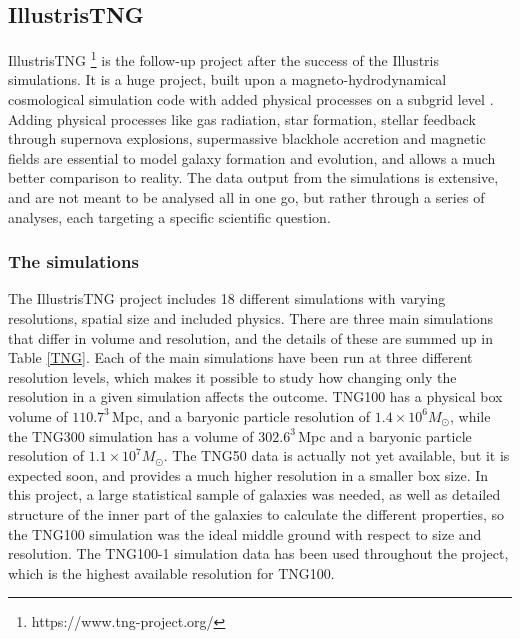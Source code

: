 \subsection{IllustrisTNG}
IllustrisTNG \footnote{https://www.tng-project.org/} is the follow-up project after the success of the Illustris simulations. It is a huge project, built upon a magneto-hydrodynamical cosmological simulation code with added physical processes on a subgrid level \parencite{Weinberger2016}. Adding physical processes like gas radiation, star formation, stellar feedback through supernova explosions, supermassive blackhole accretion and magnetic fields are essential to model galaxy formation and evolution, and allows a much better comparison to reality. The data output from the simulations is extensive, and are not meant to be analysed all in one go, but rather through a series of analyses, each targeting a specific scientific question. 


\subsubsection{The simulations}
The IllustrisTNG project includes 18 different simulations with varying resolutions, spatial size and included physics. There are three main simulations that differ in volume and resolution, and the details of these are summed up in Table \ref{TNG}. Each of the main simulations have been run at three different resolution levels, which makes it possible to study how changing only the resolution in a given simulation affects the outcome. TNG100 has a physical box volume of $110.7^3 \, $Mpc, and a baryonic particle resolution of $1.4 \times 10^6 M_{\odot}$, while the TNG300 simulation has a volume of $302.6^3 \, $Mpc and a baryonic particle resolution of $1.1 \times 10^7 M_{\odot}$. The TNG50 data is actually not yet available, but it is expected soon, and provides a much higher resolution in a smaller box size. In this project, a large statistical sample of galaxies was needed, as well as detailed structure of the inner part of the galaxies to calculate the different properties, so the TNG100 simulation was the ideal middle ground with respect to size and resolution. The TNG100-1 simulation data has been used throughout the project, which is the highest available resolution for TNG100.

